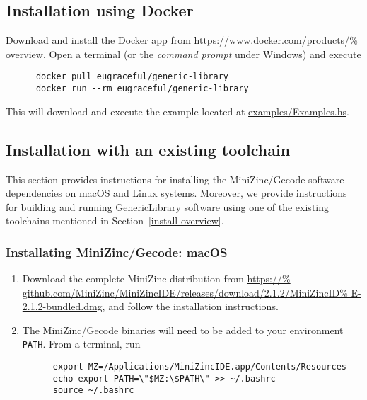 \subsection{Installation using Docker} 
\label{install-docker}

Download and install the Docker app from \url{https://www.docker.com/products/%
overview}. Open a terminal (or the \emph{command prompt} under Windows) and 
execute 

    \begin{verbatim}
      docker pull eugraceful/generic-library
      docker run --rm eugraceful/generic-library
    \end{verbatim}

This will download and execute the example located at \href{https://github.com/%
GRACeFUL-project/GenericLibrary/blob/master/examples/Examples.hs}%
{examples/Examples.hs}.

\subsection{Installation with an existing toolchain}
\label{install-minizinc}

This section provides instructions for installing the MiniZinc/Gecode software
dependencies on macOS and Linux systems. Moreover, we provide instructions for
building and running GenericLibrary software using one of the existing
toolchains mentioned in Section~\ref{install-overview}.


\subsubsection{Installating MiniZinc/Gecode: macOS} 

\begin{enumerate}
  \item Download the complete MiniZinc distribution from \url{https://%
    github.com/MiniZinc/MiniZincIDE/releases/download/2.1.2/MiniZincID%
    E-2.1.2-bundled.dmg}, and follow the installation instructions.
  \item The MiniZinc/Gecode binaries will need to be added to your environment 
    \verb+PATH+. From a terminal, run

    \begin{verbatim}
      export MZ=/Applications/MiniZincIDE.app/Contents/Resources
      echo export PATH=\"$MZ:\$PATH\" >> ~/.bashrc
      source ~/.bashrc
    \end{verbatim}
\end{enumerate}

